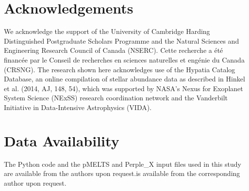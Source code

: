 \documentclass[fleqn,usenatbib,twocolumn]{mnras}
\begin{document}




\section*{Acknowledgements}

We acknowledge the support of the University of Cambridge Harding Distinguished Postgraduate Scholars Programme and the Natural Sciences and Engineering Research Council of Canada (NSERC). Cette recherche a \'et\'e financ\'ee par le Conseil de recherches en sciences naturelles et eng\'enie du Canada (CRSNG). The research shown here acknowledges use of the Hypatia Catalog Database, an online compilation of stellar abundance data as described in Hinkel et al. (2014, AJ, 148, 54), which was supported by NASA's Nexus for Exoplanet System Science (NExSS) research coordination network and the Vanderbilt Initiative in Data-Intensive Astrophysics (VIDA).


\section*{Data Availability}

The Python code and the pMELTS and Perple\_X input files used in this study are available from the authors upon request.is available from the corresponding author upon request.




\end{document}
